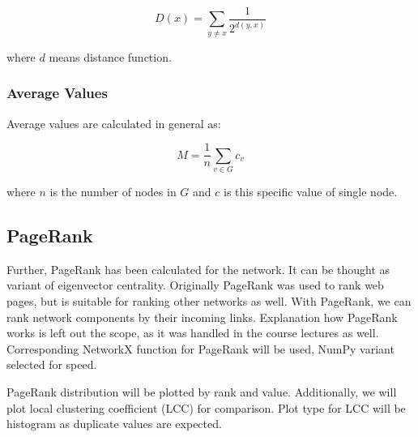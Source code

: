 \begin{equation}
    \label{eq:closeness-centrality}
    D(x)=\sum_{y\neq x}\frac{1}{2^{d(y,x)}}
\end{equation}

where $d$ means distance function.

\subsubsection{Average Values}

Average values are calculated in general as:

\begin{equation}
    \label{eq:average}
    M = \frac{1}{n}\sum_{v \in G} c_v
\end{equation}

\noindent where $n$ is the number of nodes in $G$ and $c$ is this specific value of single node.

\subsection{PageRank}

Further, PageRank has been calculated for the network.
It can be thought as variant of eigenvector centrality.
Originally PageRank was used to rank web pages, but is suitable for ranking other networks as well.\cite{ilprints422}
With PageRank, we can rank network components by their incoming links.
Explanation how PageRank works is left out the scope, as it was handled in the course lectures as well.
Corresponding NetworkX function for PageRank will be used, NumPy variant selected for speed.

PageRank distribution will be plotted by rank and value.
Additionally, we will plot local clustering coefficient (LCC) for comparison.
Plot type for LCC will be histogram as duplicate values are expected.

